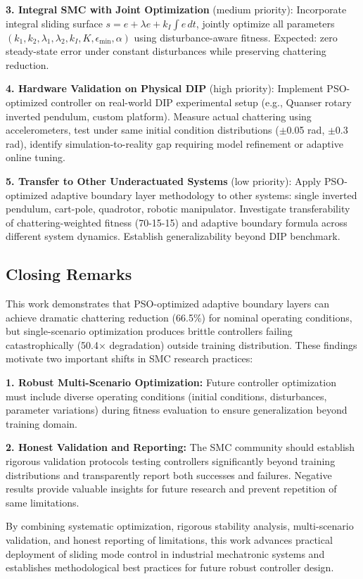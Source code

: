 \documentclass[conference]{IEEEtran}
\begin{document}
\textbf{3. Integral SMC with Joint Optimization} (medium priority): Incorporate integral sliding surface $s = e + \lambda e + k_I \int e \, dt$, jointly optimize all parameters $(k_1, k_2, \lambda_1, \lambda_2, k_I, K, \epsilon_{\min}, \alpha)$ using disturbance-aware fitness. Expected: zero steady-state error under constant disturbances while preserving chattering reduction.

\textbf{4. Hardware Validation on Physical DIP} (high priority): Implement PSO-optimized controller on real-world DIP experimental setup (e.g., Quanser rotary inverted pendulum, custom platform). Measure actual chattering using accelerometers, test under same initial condition distributions ($\pm$0.05 rad, $\pm$0.3 rad), identify simulation-to-reality gap requiring model refinement or adaptive online tuning.

\textbf{5. Transfer to Other Underactuated Systems} (low priority): Apply PSO-optimized adaptive boundary layer methodology to other systems: single inverted pendulum, cart-pole, quadrotor, robotic manipulator. Investigate transferability of chattering-weighted fitness (70-15-15) and adaptive boundary formula across different system dynamics. Establish generalizability beyond DIP benchmark.

\subsection{Closing Remarks}

This work demonstrates that PSO-optimized adaptive boundary layers can achieve dramatic chattering reduction (66.5\%) for nominal operating conditions, but single-scenario optimization produces brittle controllers failing catastrophically (50.4$\times$ degradation) outside training distribution. These findings motivate two important shifts in SMC research practices:

\textbf{1. Robust Multi-Scenario Optimization:} Future controller optimization must include diverse operating conditions (initial conditions, disturbances, parameter variations) during fitness evaluation to ensure generalization beyond training domain.

\textbf{2. Honest Validation and Reporting:} The SMC community should establish rigorous validation protocols testing controllers significantly beyond training distributions and transparently report both successes and failures. Negative results provide valuable insights for future research and prevent repetition of same limitations.

By combining systematic optimization, rigorous stability analysis, multi-scenario validation, and honest reporting of limitations, this work advances practical deployment of sliding mode control in industrial mechatronic systems and establishes methodological best practices for future robust controller design.



\end{document}
